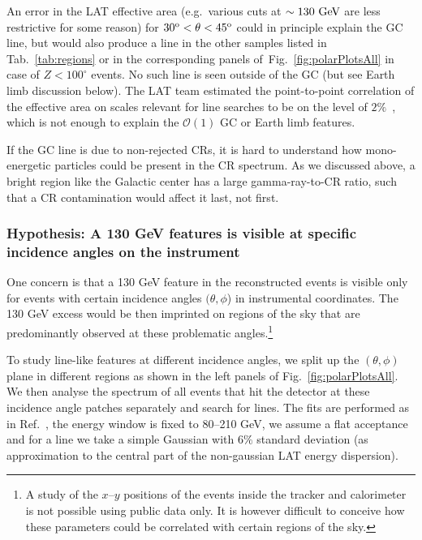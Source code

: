\documentclass[aps,twocolumn,prd,superscriptaddress,showpacs,nofootinbib,fixfloat]{revtex4}
\newcommand{\GeV}{{\rm ~GeV}}
\newcommand{\degree}{^{\rm o}}
\begin{document}
An error in the LAT effective area (e.g.~various cuts at $\sim130\GeV$ are
less restrictive for some reason) for $30\degree < \theta < 45\degree$ could
in principle explain the GC line, but would also produce a line in the other
samples listed in Tab.~\ref{tab:regions} or in the corresponding panels
of~Fig.~\ref{fig:polarPlotsAll} in case of $Z<100^\circ$ events. No such line
is seen outside of the GC (but see Earth limb discussion below). The LAT team
estimated the point-to-point correlation of the effective area on scales
relevant for line searches to be on the level of $2\%$~\cite{performance},
which is not enough to explain the $\mathcal{O}(1)$ GC or Earth limb features.

If the GC line is due to non-rejected CRs, it is hard to understand how
mono-energetic particles could be present in the CR spectrum. As we discussed
above, a bright region like the Galactic center has a large gamma-ray-to-CR
ratio, such that a CR contamination would affect it last, not first.

\subsubsection{Hypothesis: A 130 GeV features is visible
at specific incidence angles on the instrument}


One concern is that a 130 GeV feature in the
reconstructed events is visible only for events with certain
incidence angles $(\theta, \phi$) in instrumental
coordinates. The 130 GeV excess would be then imprinted on
regions of the sky that are predominantly observed at
these problematic angles.\footnote{A study of the
$x$--$y$ positions of the events inside the tracker and calorimeter
is not possible using public data only.
It is however difficult to conceive how these 
parameters could be correlated with certain regions of the
sky.}

To study line-like features at different incidence
angles, we split up the $(\theta, \phi)$ plane in different
regions as shown in the left panels of
Fig.~\ref{fig:polarPlotsAll}. We then analyse the spectrum
of all events that hit the detector at these incidence
angle patches separately and search for lines. The fits are
performed as in Ref.~\cite{Weniger:2012}, the energy
window is fixed to 80--210 GeV, we assume a flat
acceptance and for a line we take a simple Gaussian with $6\%$
standard deviation (as approximation to the central part of the non-gaussian
LAT energy dispersion).
\end{document}
